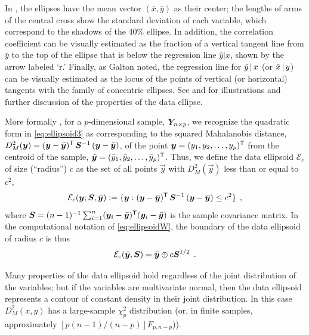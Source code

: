 In , the ellipses have the mean vector
$(\bar{x}, \bar{y})$ as their center;  the lengths of arms of the
central cross show the standard deviation of each variable, which
correspond to the shadows of the 40\% ellipse.  In
addition, the correlation coefficient can be visually estimated as
the fraction of a vertical tangent line from $\bar{y}$ to the top of
the ellipse that is below the regression line $\hat{y} | x$, shown
by the arrow labeled `r.' Finally, as Galton noted, the regression line
for $\hat{y} \, | \, x$ (or $\hat{x} \, | \, y$)
can be visually estimated as the locus of the points of vertical
(or horizontal) tangents with the family of concentric ellipses.
See \citet[Figs.~5.1--5.2]{Monette:90} and
\citet[p.~183]{Friendly:91} for illustrations and further discussion
of the properties of the data ellipse.

More formally \citep{Dempster:69,Monette:90}, for a $p$-dimensional
sample, $\bm{Y}_{n \times p}$,
we recognize the quadratic form in \eqref{eq:ellipsoid3}
as corresponding to the squared Mahalanobis distance,
$D^2_M (\bm{y}) = (\bm{y} - \bar{\bm{y}})^\mathsf{T} \, \bm{S}^{-1} \, (\bm{y} - \bar{\bm{y}})$,
of the point
$\bm{y} = (y_1, y_2, \dots , y_p)^\mathsf{T}$
from the centroid of the sample,
$\bar{\bm{y}} = (\bar{y}_1, \bar{y}_2, \dots , \bar{y}_p)^\mathsf{T}$.
Thus, we define the data ellipsoid $\mathcal{E}_c$ of size (``radius'') $c$
as the set of all points $\vec{y}$ with $D^2_M (\vec{y})$ less than or
equal to $c^2$,
\begin{equation}\label{eq:dsq}
\mathcal{E}_c ( \bm{y}; \bm{S},  \bar{\bm{y}} )
:= \{ \bm{y} :
(\bm{y} - \bar{\bm{y}})^\mathsf{T} \, \bm{S}^{-1} \, (\bm{y} - \bar{\bm{y}}) \le c^2 \} \:\: ,
\end{equation}
where
$\bm{S} = ({n-1})^{-1} \sum_{i=1}^n (\bm{y}_i - \bar{\bm{y}})^\mathsf{T} (\bm{y}_i - \bar{\bm{y}})$
is the sample covariance matrix.  In the computational notation of \eqref{eq:ellipsoidW}, the boundary of the
data ellipsoid of radius $c$ is thus
\begin{equation}\label{eq:ellipsoidS}
\mathcal{E}_c(\bar{\bm{y}}, \bm{S}) = \bar{\bm{y}} \oplus c \bm{S}^{1/2} \:\: .
\end{equation}

Many properties of the data ellipsoid hold regardless of the joint distribution of the
variables; but if the variables are multivariate normal, then the data ellipsoid represents
a contour of constant density in their joint distribution.  In this case $D^2_M (x,y)$
has a large-sample $\chi^2_p$ distribution (or, in finite samples, approximately
$[p (n-1) / (n-p)] F_{p, n-p}$)).

